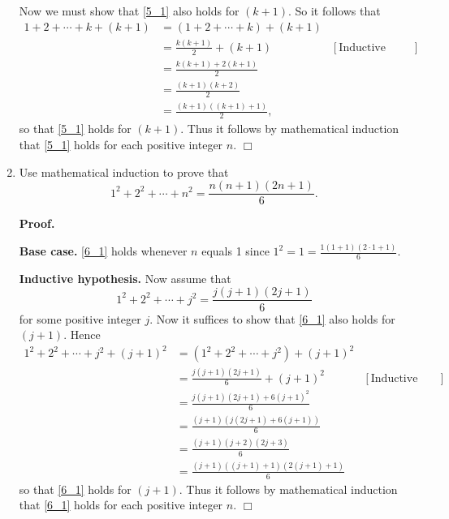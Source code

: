 \documentclass[9pt]{article}
\newcommand{\qed}{\hfill \ensuremath{\Box}}
\newcommand{\D}{\displaystyle}
\begin{document}
\begin{enumerate}
      Now we must show that \eqref{5_1} also holds for $(k+1)$. So it follows
      that
      \begin{align*}
         1 + 2 + \cdots + k + (k+1) &= (1 + 2 + \cdots + k) + (k + 1) \\
            &= \frac{k(k+1)}{2} + (k+1) &[\text{Inductive hypothesis}] \\
            &= \frac{k(k+1)+2(k+1)}{2} \\
            &= \frac{(k+1)(k+2)}{2} \\
            &= \frac{(k+1)((k+1)+1)}{2},
      \end{align*}
      so that \eqref{5_1} holds for $(k+1)$. Thus it follows by mathematical 
      induction that \eqref{5_1} holds for each positive integer $n$. \qed
   \item Use mathematical induction to prove that
         \begin{equation} \label{6_1}
            1^2 + 2^2 + \cdots + n^2 = \frac{n(n+1)(2n+1)}{6}.
         \end{equation}

      \textbf{Proof.} 

      \textbf{Base case.} \eqref{6_1} holds whenever $n$ equals 1 since
      $1^2 = 1 = \D\frac{1(1+1)(2\cdot1+1)}{6}$.

      \textbf{Inductive hypothesis.} Now assume that
      $$1^2 + 2^2 + \cdots + j^2 = \frac{j(j+1)(2j+1)}{6}$$
      for some positive integer $j$. Now it suffices to show that \eqref{6_1} 
      also holds for $(j+1)$. Hence
      \begin{align*}
         1^2 + 2^2 + \cdots + j^2 + (j+1)^2 &=
            (1^2 + 2^2 + \cdots + j^2) + (j + 1)^2 \\
            &= \frac{j(j+1)(2j+1)}{6} + (j + 1)^2
                  &[\text{Inductive hypothesis}] \\
            &= \frac{j(j+1)(2j+1) + 6(j+1)^2}{6} \\
            &= \frac{(j+1)(j(2j+1)+6(j+1))}{6} \\
            &= \frac{(j+1)(j+2)(2j+3)}{6} \\
            &= \frac{(j+1)((j+1)+1)(2(j+1)+1)}{6}
      \end{align*}
      so that \eqref{6_1} holds for $(j+1)$. Thus it follows by mathematical 
      induction that \eqref{6_1} holds for each positive integer $n$. \qed
      
\end{enumerate}
\end{document}
